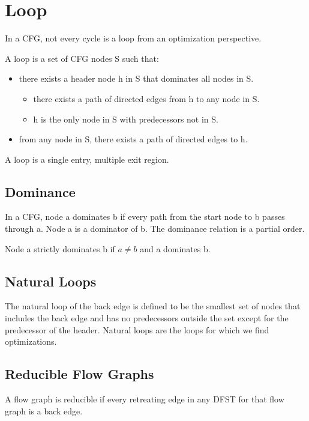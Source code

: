 
\section{Loop}

In a CFG, not every cycle is a loop from an optimization perspective.


A loop is a set of CFG nodes S such that:
\begin{itemize}
    \item there exists a header node h in S that dominates all nodes in S.
    \begin{itemize}
        \item there exists a path of directed edges from h to any node in S.
        \item h is the only node in S with predecessors not in S.
    \end{itemize}
    \item from any node in S, there exists a path of directed edges to h.
\end{itemize}
A loop is a single entry, multiple exit region.

\subsection{Dominance}

In a CFG, node a dominates b if every path from the start node to b passes through a. Node a is a dominator of b. The dominance relation is a partial order.


Node a strictly dominates b if $a \neq b$ and a dominates b.




\subsection{Natural Loops}

The natural loop of the back edge is defined to be the smallest set of nodes that includes the back edge and has no predecessors outside the set except for the predecessor of the header. Natural loops are the loops for which we find optimizations.

\subsection{Reducible Flow Graphs}
A flow graph is reducible if every retreating edge in any DFST for that flow graph is a back edge.

